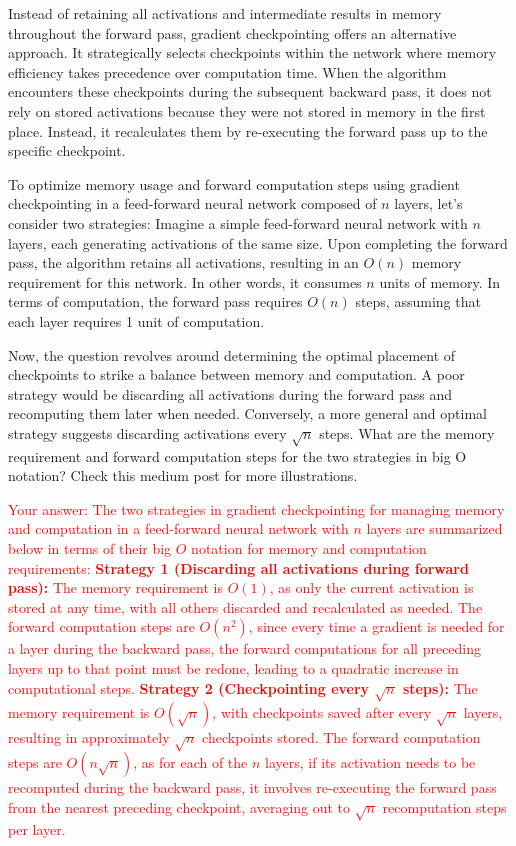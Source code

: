 Instead of retaining all activations and intermediate results in memory throughout the forward pass, gradient checkpointing offers an alternative approach. It strategically selects checkpoints within the network where memory efficiency takes precedence over computation time. When the algorithm encounters these checkpoints during the subsequent backward pass, it does not rely on stored activations because they were not stored in memory in the first place. Instead, it recalculates them by re-executing the forward pass up to the specific checkpoint.

To optimize memory usage and forward computation steps using gradient checkpointing in a feed-forward neural network composed of $n$ layers, let's consider two strategies: Imagine a simple feed-forward neural network with $n$ layers, each generating activations of the same size. Upon completing the forward pass, the algorithm retains all activations, resulting in an $O(n)$ memory requirement for this network. In other words, it consumes $n$ units of memory. In terms of computation, the forward pass requires $O(n)$ steps, assuming that each layer requires 1 unit of computation.

Now, the question revolves around determining the optimal placement of checkpoints to strike a balance between memory and computation. A poor strategy would be discarding all activations during the forward pass and recomputing them later when needed. Conversely, a more general and optimal strategy suggests discarding activations every $\sqrt{n}$ steps. What are the memory requirement and forward computation steps for the two strategies in big O notation? Check this medium post \cite{checkpointing} for more illustrations.

\textcolor{red}{
Your answer: The two strategies in gradient checkpointing for managing memory and computation in a feed-forward neural network with \( n \) layers are summarized below in terms of their big \( O \) notation for memory and computation requirements:
\textbf{Strategy 1 (Discarding all activations during forward pass):} The memory requirement is \( O(1) \), as only the current activation is stored at any time, with all others discarded and recalculated as needed. The forward computation steps are \( O(n^2) \), since every time a gradient is needed for a layer during the backward pass, the forward computations for all preceding layers up to that point must be redone, leading to a quadratic increase in computational steps.
\textbf{Strategy 2 (Checkpointing every \( \sqrt{n} \) steps):} The memory requirement is \( O(\sqrt{n}) \), with checkpoints saved after every \( \sqrt{n} \) layers, resulting in approximately \( \sqrt{n} \) checkpoints stored. The forward computation steps are \( O(n \sqrt{n}) \), as for each of the \( n \) layers, if its activation needs to be recomputed during the backward pass, it involves re-executing the forward pass from the nearest preceding checkpoint, averaging out to \( \sqrt{n} \) recomputation steps per layer.
}

